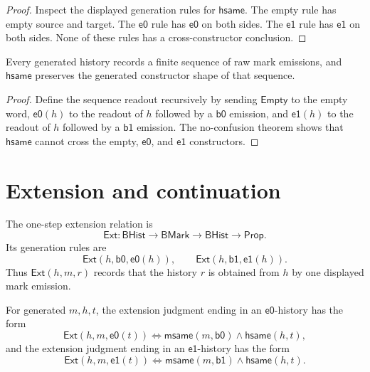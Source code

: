 \begin{proof}
Inspect the displayed generation rules for $\mathsf{hsame}$.  The empty
rule has empty source and target.  The $\mathsf{e0}$ rule has
$\mathsf{e0}$ on both sides.  The $\mathsf{e1}$ rule has $\mathsf{e1}$ on
both sides.  None of these rules has a cross-constructor conclusion.
\end{proof}

\begin{corollary}
\label{cor:kernel-spine-histories-record-sequences}
Every generated history records a finite sequence of raw mark emissions,
and $\mathsf{hsame}$ preserves the generated constructor shape of that
sequence.
\end{corollary}

\begin{proof}
Define the sequence readout recursively by sending $\mathsf{Empty}$ to the
empty word, $\mathsf{e0}(h)$ to the readout of $h$ followed by a
$\mathsf{b0}$ emission, and $\mathsf{e1}(h)$ to the readout of $h$ followed
by a $\mathsf{b1}$ emission.  The no-confusion theorem shows that
$\mathsf{hsame}$ cannot cross the empty, $\mathsf{e0}$, and $\mathsf{e1}$
constructors.
\end{proof}

\section{Extension and continuation}
\label{sec:mark-hist-ext-cont-extension-continuation}

\begin{definition}
\label{def:kernel-spine-extension}
The one-step extension relation is
$$
\mathsf{Ext}:\mathsf{BHist}\to\mathsf{BMark}\to\mathsf{BHist}\to
\mathsf{Prop}.
$$
Its generation rules are
$$
\mathsf{Ext}(h,\mathsf{b0},\mathsf{e0}(h)),
\qquad
\mathsf{Ext}(h,\mathsf{b1},\mathsf{e1}(h)).
$$
Thus $\mathsf{Ext}(h,m,r)$ records that the history $r$ is obtained from
$h$ by one displayed mark emission.
\end{definition}

\begin{theorem}
\label{thm:kernel-spine-extension-result-characterization}
For generated $m,h,t$, the extension judgment ending in an
$\mathsf{e0}$-history has the form
$$
\mathsf{Ext}(h,m,\mathsf{e0}(t))
\Longleftrightarrow
\mathsf{msame}(m,\mathsf{b0})
\wedge
\mathsf{hsame}(h,t),
$$
and the extension judgment ending in an $\mathsf{e1}$-history has the form
$$
\mathsf{Ext}(h,m,\mathsf{e1}(t))
\Longleftrightarrow
\mathsf{msame}(m,\mathsf{b1})
\wedge
\mathsf{hsame}(h,t).
$$
\end{theorem}

